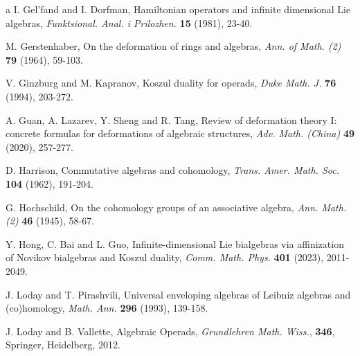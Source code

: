 \documentclass[12pt]{amsart}
\theoremstyle{definition}
\begin{document}
\begin{thebibliography}{a}
I. Gel'fand and I. Dorfman, Hamiltonian operators and infinite dimensional Lie algebras, {\em Funktsional. Anal. i Prilozhen.} {\bf 15} (1981), 23-40.

M. Gerstenhaber, On the deformation of rings and algebras, \emph{Ann. of Math. (2)} {\bf79} (1964), 59-103.

V. Ginzburg and M. Kapranov, Koszul duality for operads, {\em Duke Math. J.} {\bf 76} (1994), 203-272.


A. Guan, A. Lazarev, Y. Sheng and R. Tang, Review of deformation theory I: concrete formulas for deformations of algebraic structures, {\em Adv. Math. (China)} {\bf 49} (2020), 257-277.

D. Harrison, Commutative algebras and cohomology, {\em Trans. Amer. Math. Soc.}  {\bf 104} (1962), 191-204.


G. Hochschild, On the cohomology groups of an associative algebra, {\em Ann.  Math. (2)}  {\bf 46} (1945), 58-67.

Y. Hong, C. Bai and L. Guo, Infinite-dimensional Lie bialgebras via affinization of Novikov bialgebras and Koszul duality, {\em Comm. Math. Phys.} {\bf 401} (2023), 2011-2049.





J. Loday and T. Pirashvili, Universal enveloping algebras of Leibniz algebras and (co)homology, \emph{Math. Ann.} {\bf 296} (1993), 139-158.

J. Loday and B. Vallette, Algebraic Operads, {\em Grundlehren Math. Wiss.}, {\bf 346}, Springer, Heidelberg, 2012.


\end{thebibliography}
\end{document}
